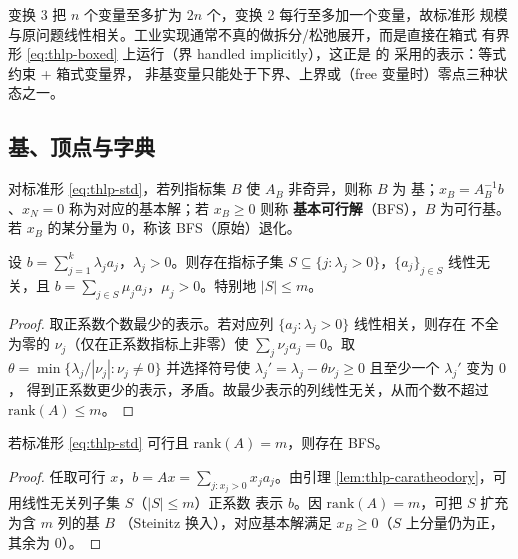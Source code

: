 \begin{remark}\label{rem:thlp-transform-cost}
变换 3 把 $n$ 个变量至多扩为 $2n$ 个，变换 2 每行至多加一个变量，故标准形
规模与原问题线性相关。工业实现通常不真的做拆分/松弛展开，而是直接在箱式
有界形 \eqref{eq:thlp-boxed} 上运行（界 handled implicitly），这正是
 的
 采用的表示：等式约束 + 箱式变量界，
非基变量只能处于下界、上界或（free 变量时）零点三种状态之一。
\end{remark}

\subsection{基、顶点与字典}\label{subsec:thlp-basis}

\begin{definition}[基与基本解]\label{def:thlp-bfs}
对标准形 \eqref{eq:thlp-std}，若列指标集 $B$ 使 $A_B$ 非奇异，则称 $B$ 为
基；$x_B=A_B^{-1}b$、$x_N=0$ 称为对应的基本解；若 $x_B\ge0$ 则称
\textbf{基本可行解}（BFS），$B$ 为可行基。若 $x_B$ 的某分量为 $0$，称该
BFS（原始）退化。
\end{definition}

\begin{lemma}\label{lem:thlp-caratheodory}
设 $b=\sum_{j=1}^{k}\lambda_j a_j$，$\lambda_j>0$。则存在指标子集
$S\subseteq\{j:\lambda_j>0\}$，$\{a_j\}_{j\in S}$ 线性无关，且
$b=\sum_{j\in S}\mu_j a_j$，$\mu_j>0$。特别地 $|S|\le m$。
\end{lemma}

\begin{proof}
取正系数个数最少的表示。若对应列 $\{a_j:\lambda_j>0\}$ 线性相关，则存在
不全为零的 $\nu_j$（仅在正系数指标上非零）使 $\sum_j\nu_j a_j=0$。取
$\theta=\min\{\lambda_j/|\nu_j|:\nu_j\ne0\}$ 并选择符号使
$\lambda_j'=\lambda_j-\theta\nu_j\ge0$ 且至少一个 $\lambda_j'$ 变为 $0$，
得到正系数更少的表示，矛盾。故最少表示的列线性无关，从而个数不超过
$\mathrm{rank}(A)\le m$。
\end{proof}

\begin{proposition}[基本可行解的存在性]\label{prop:thlp-bfs-exist}
若标准形 \eqref{eq:thlp-std} 可行且 $\mathrm{rank}(A)=m$，则存在 BFS。
\end{proposition}

\begin{proof}
任取可行 $x$，$b=Ax=\sum_{j:x_j>0}x_j a_j$。由引理
\ref{lem:thlp-caratheodory}，可用线性无关列子集 $S$（$|S|\le m$）正系数
表示 $b$。因 $\mathrm{rank}(A)=m$，可把 $S$ 扩充为含 $m$ 列的基 $B$
（Steinitz 换入），对应基本解满足 $x_B\ge0$（$S$ 上分量仍为正，其余为 $0$）。
\end{proof}

